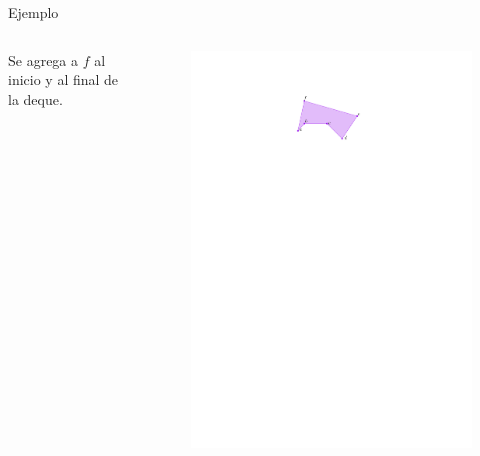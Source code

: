 \documentclass[aspectratio=169,xcolor=dvipsnames, t]{beamer}
\begin{document}
\begin{frame}{Ejemplo}
  \begin{columns}
    \begin{column}{0.5\textwidth}
      Se agrega a $f$ al inicio y al final de la deque.
    \end{column}
    \begin{column}{0.5\textwidth}
      \begin{figure}
        \centering
        \includegraphics[width=\linewidth, height=0.5\textheight, page=12, keepaspectratio]{IPE/Melkman.pdf}
      \end{figure}
    \end{column}
  \end{columns}
\end{frame}
\end{document}

